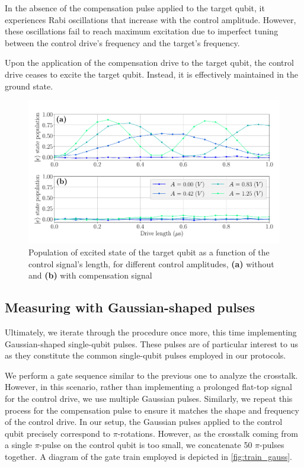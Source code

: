 In the absence of the compensation pulse applied to the target qubit, it experiences Rabi oscillations that increase with the control amplitude.
However, these oscillations fail to reach maximum excitation due to imperfect tuning between the control drive's frequency and the target's frequency.

Upon the application of the compensation drive to the target qubit, the control drive ceases to excite the target qubit.
Instead, it is effectively maintained in the ground state.

\begin{figure}
    \centering
    \includegraphics[width=1\linewidth]{Images//Chap2.0/Raby_flattop_cancellation.pdf}
    \vspace{-0.8cm}
    \caption{Population of excited state of the target qubit as a function of the control signal's length, for different control amplitudes, \textbf{(a)} without and \textbf{(b)} with compensation signal}
    \label{fig:Rabi_flattop_canc}
\end{figure}

\subsection{Measuring with Gaussian-shaped pulses}
\label{sec:gaussian_shaped}

Ultimately, we iterate through the procedure once more, this time implementing Gaussian-shaped single-qubit pulses.
These pulses are of particular interest to us as they constitute the common single-qubit pulses employed in our protocols.

We perform a gate sequence similar to the previous one to analyze the crosstalk.
However, in this scenario, rather than implementing a prolonged flat-top signal for the control drive, we use multiple Gaussian pulses.
Similarly, we repeat this process for the compensation pulse to ensure it matches the shape and frequency of the control drive. 
In our setup, the Gaussian pulses applied to the control qubit precisely correspond to $\pi$-rotations.
However, as the crosstalk coming from a single $\pi$-pulse on the control qubit is too small, we concatenate 50 $\pi$-pulses together.
A diagram of the gate train employed is depicted in \cref{fig:train_gauss}.

